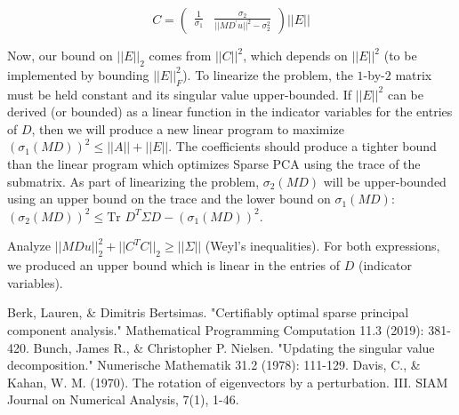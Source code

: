 \documentclass{article}
\begin{document}
$$
C =
\left(
    \begin{matrix}
        \frac{1}{\sigma_1}
        &
        \frac{\sigma_2}{||MD^\prime u||^2 - \sigma_2^2}
    \end{matrix}
\right)
||E||
$$

Now, our bound on $||E||_2$ comes from $||C||^2$, which depends on $||E||^2$ (to be implemented by bounding $||E||_F^2$). To linearize the problem, the $1$-by-$2$ matrix must be held constant and its singular value upper-bounded.
If $||E||^2$ can be derived (or bounded) as a linear function in the indicator variables for the entries of $D$, then we will produce a new linear program to maximize $(\sigma_1(MD))^2 \le ||A|| + ||E||$. The coefficients should produce a tighter bound than the linear program which optimizes Sparse PCA using the trace of the submatrix. As part of linearizing the problem, $\sigma_2(MD)$ will be upper-bounded using an upper bound on the trace and the lower bound on $\sigma_1(MD)$: $(\sigma_2(MD))^2 \le \text{Tr } D^T\Sigma D - (\sigma_1(MD))^2$.

Analyze $||MDu||_2^2 + ||C^T C||_2 \ge ||\Sigma||$ (Weyl's inequalities). For both expressions, we produced an upper bound which is linear in the entries of $D$ (indicator variables).

\begin{thebibliography}{9}
     Berk, Lauren, \& Dimitris Bertsimas. "Certifiably optimal sparse principal component analysis." Mathematical Programming Computation 11.3 (2019): 381-420.
     Bunch, James R., \& Christopher P. Nielsen. "Updating the singular value decomposition." Numerische Mathematik 31.2 (1978): 111-129.
     Davis, C., \& Kahan, W. M. (1970). The rotation of eigenvectors by a perturbation. III. SIAM Journal on Numerical Analysis, 7(1), 1-46.
\end{thebibliography}
\end{document}
